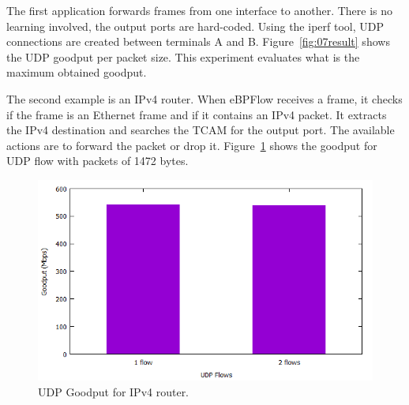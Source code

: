The first application forwards frames from one interface to another. There is no learning involved, the output ports are hard-coded. Using the iperf tool, UDP connections are created between terminals A and B. Figure~\ref{fig:07result} shows the UDP goodput per packet size. This experiment evaluates what is the maximum obtained goodput.

The second example is an IPv4 router.
When eBPFlow receives a frame, it checks if the frame is an Ethernet frame and if it contains an IPv4 packet. It extracts the IPv4 destination and searches the TCAM for the output port.
The available actions are to forward the packet or drop it.
Figure~\ref{fig:IPv4routerresult} shows the goodput for UDP flow with packets of 1472 bytes.

\begin{figure}[htb]
\centering
\includegraphics[width=1.\linewidth]{figures/ipv4goodput.png}
\caption{UDP Goodput for IPv4 router.}
\label{fig:IPv4routerresult}
\end{figure}



